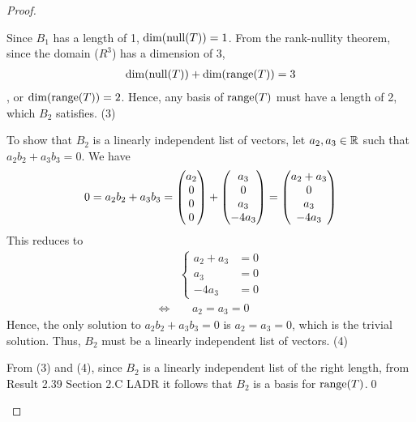 \begin{proof}
\begin{enumerate}[(i)]
        Since $B_1$ has a length of 1, $\textnormal{dim}(\textnormal{null}(T))=1$. From the rank-nullity theorem, since the domain ($R^3$) has a dimension of 3,
        \[
            \begin{aligned}
                \textnormal{dim}(\textnormal{null}(T))+\textnormal{dim}(\textnormal{range}(T))=3
            \end{aligned}
        \]
        , or $\textnormal{dim}(\textnormal{range}(T))=2$. Hence, any basis of $\textnormal{range}(T)$ must have a length of 2, which $B_2$ satisfies. (3)

        To show that $B_2$ is a linearly independent list of vectors, let $a_2,a_3\in\mathbb R$ such that $a_2b_2+a_3b_3=0$. We have 
        \[
            \begin{aligned}
                0 = a_2b_2+a_3b_3 = \begin{pmatrix} a_2\\ 0\\0 \\ 0\end{pmatrix}+\begin{pmatrix} a_3\\ 0\\a_3 \\ -4a_3\end{pmatrix}= \begin{pmatrix} a_2+a_3\\ 0\\a_3 \\ -4a_3\end{pmatrix}      
            \end{aligned}
        \]
        This reduces to 
        \begin{align*}
            &\begin{cases}
                a_2+a_3 &= 0\\
                a_3 &= 0\\
                -4a_3 &= 0
            \end{cases}\\
            \iff&\quad \, a_2=a_3=0
        \end{align*}
        Hence, the only solution to $a_2b_2+a_3b_3=0$ is $a_2=a_3=0$, which is the trivial solution. Thus, $B_2$ must be a linearly independent list of vectors. (4)

        From (3) and (4), since $B_2$ is a linearly independent list of the right length, from Result 2.39 Section 2.C LADR it follows that $B_2$ is a basis for $\textnormal{range}(T)$.\qed
    \end{enumerate}
    \renewcommand{\qedsymbol}{}
\end{proof}